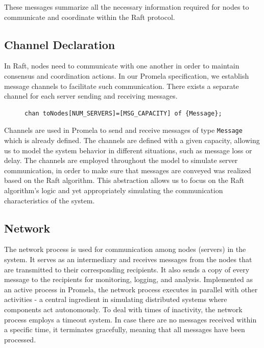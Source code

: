 \documentclass[a4paper]{llncs}
\begin{document}
These messages summarize all the necessary information required for nodes to communicate and coordinate within the Raft protocol.

    \subsection{Channel Declaration}
    \label{sec:channel_declaration}
    In Raft, nodes need to communicate with one another in order to maintain
consensus and coordination actions. In our Promela specification, we establish message channels
to facilitate such communication. There exists a separate channel for each server
sending and receiving messages.
    
    \begin{figure}[htbp]
        \centering
        \begin{lstlisting}[style=promela, caption={State Declaration}]
chan toNodes[NUM_SERVERS]=[MSG_CAPACITY] of {Message};
\end{lstlisting}
    \end{figure}
Channels are used in Promela to
send and receive messages of type \texttt{Message} which is already defined. The channels are defined with a given capacity,
allowing us to model the system behavior in different situations, such
as message loss or delay. The channels are employed throughout the model to
simulate server communication, in order to make sure that messages are conveyed was realized based on the Raft algorithm. This abstraction
allows us to focus on the Raft algorithm's logic and yet appropriately
simulating the communication characteristics of the system.
    


    \subsection{Network}
    \label{sec:network}

The network process is used for communication among nodes (servers) in the system. It serves as an intermediary and receives messages from the nodes that are transmitted to their corresponding recipients. It also sends a copy of every message to the recipients for monitoring, logging, and analysis. Implemented as an active process in Promela, the network process executes in parallel with other activities - a central ingredient in simulating distributed systems where components act autonomously. To deal with times of inactivity, the network process employs a timeout system. In case there are no messages received within a specific time, it terminates gracefully, meaning that all messages have been processed.
\end{document}

